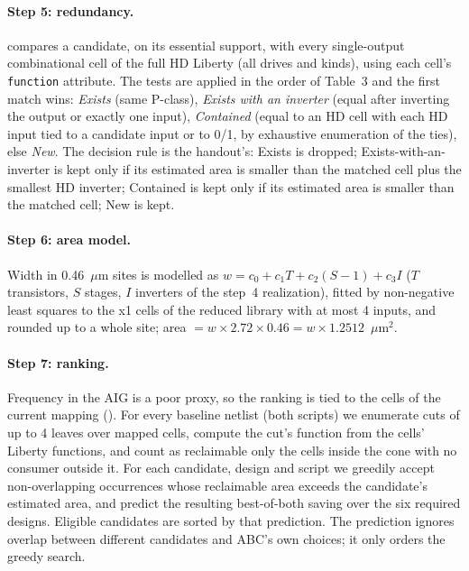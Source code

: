 \documentclass[10pt,a4paper]{article}
\newcommand{\um}{\ensuremath{\mu\mathrm{m}^2}}
\newcommand{\file}[1]{\texttt{\detokenize{#1}}}
\begin{document}
\paragraph{Step 5: redundancy.} \file{dd2/redundancy.py} compares a candidate, on its essential support,
with every single-output combinational cell of the full HD Liberty (all drives and kinds), using
each cell's \texttt{function} attribute. The tests are applied in the order of Table~3 and the first
match wins: \emph{Exists} (same P-class), \emph{Exists with an inverter} (equal after inverting the
output or exactly one input), \emph{Contained} (equal to an HD cell with each HD input tied to a
candidate input or to 0/1, by exhaustive enumeration of the ties), else \emph{New}. The decision rule
is the handout's: Exists is dropped; Exists-with-an-inverter is kept only if its estimated area is
smaller than the matched cell plus the smallest HD inverter; Contained is kept only if its estimated
area is smaller than the matched cell; New is kept.

\paragraph{Step 6: area model.} Width in 0.46~$\mu$m sites is modelled as
$w = c_0 + c_1 T + c_2 (S-1) + c_3 I$ ($T$ transistors, $S$ stages, $I$ inverters of the step~4
realization), fitted by non-negative least squares to the x1 cells of the reduced library with at
most 4 inputs, and rounded up to a whole site; area $= w\times 2.72\times 0.46 = w\times 1.2512$~\um.

\paragraph{Step 7: ranking.} Frequency in the AIG is a poor proxy, so the ranking is tied to the cells of
the current mapping (\file{dd2m2/cones.py}). For every baseline netlist (both scripts) we enumerate cuts
of up to 4 leaves over mapped cells, compute the cut's function from the cells' Liberty functions, and
count as reclaimable only the cells inside the cone with no consumer outside it. For each candidate,
design and script we greedily accept non-overlapping occurrences whose reclaimable area exceeds the
candidate's estimated area, and predict the resulting best-of-both saving over the six required
designs. Eligible candidates are sorted by that prediction. The prediction ignores overlap between
different candidates and ABC's own choices; it only orders the greedy search.
\end{document}
